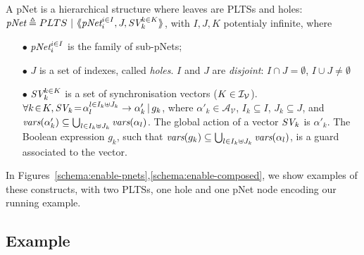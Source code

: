 \documentclass[smallcondensed]{svjour3}
\newcommand{\cA}{\ensuremath{\mathcal{A}}}
\newcommand{\cV}{\ensuremath{\mathcal{V}}}
\newcommand{\variables}{\ensuremath{\cV}}
\newcommand{\actions}[1]{\ensuremath{\cA_{#1}}}
\def\AlgAS{\mathcal{A}_S}
\begin{document}
\begin{definition}[pNets]\label{def-pnets}
	A pNet is a hierarchical structure where leaves are PLTSs and holes:
	$\pNet\triangleq PLTS~|~\mylangle \pNet_i^{i\in I}, J, \symb{SV}_k^{k\in 
		K}\myrangle$, with $I, J, K$ potentialy infinite,
	where
	\begin{itemize}
		\item[$\bullet$] $\pNet_i^{i\in I}$ is the family of sub-pNets;
		
		\item[$\bullet$] $J$ is a set of indexes, called \emph{holes}.
		$I$ and $J$ are \emph{disjoint}: $I\!\cap\! J=\emptyset$,  $I\!\cup\! J\neq\emptyset$
		
		\item[$\bullet$] $\symb{SV}_k^{k\in K}$ is a set of
		synchronisation vectors ($K\in\mathcal{I}_\mathcal V$). $\forall k\!\in\! K,
		\symb{SV}_k\!=\!\alpha_{l}^{l\in I_k \uplus J_k}\to\alpha'_k\,|\,g_k$, where
		$\alpha'_k\in \actions{\variables}$, $I_k\subseteq I$, $J_k\subseteq J$, and 
		$\vars(\alpha'_k)\subseteq \bigcup_{l\in I_k\uplus 
			J_k}{\vars({\alpha_l})}$. The global action of a vector $\symb{SV}_k$ is
		$\alpha'_k$. The Boolean expression $g_k $, such that $\vars(g_k)\subseteq \bigcup_{l\in 
			I_k\uplus J_k}{\vars({\alpha_l})}$, is a guard associated to the vector.
		
	\end{itemize}
\end{definition}

In Figures~\ref{schema:enable-pnets},\ref{schema:enable-composed}, we show
examples of these constructs, with two PLTSs, one hole and one pNet
node encoding our running example. 

\subsection{Example}
\label{section:running-example}
\end{document}

